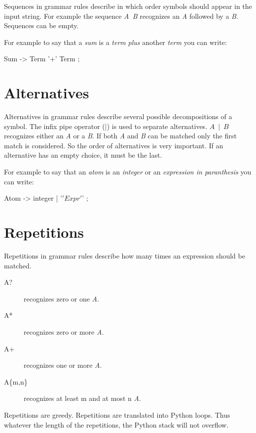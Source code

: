 Sequences in grammar rules describe in which order symbols should appear in the input string.
For example the sequence \emph{A~B} recognizes an \emph{A} followed by a \emph{B}.
Sequences can be empty.

For example to say that a \emph{sum} is a \emph{term} \emph{plus} another \emph{term} you can write:
\begin{verbatimtab}[4]
	Sum -> Term '+' Term ;
\end{verbatimtab}

\section{Alternatives}											\label{parser:alternatives}

Alternatives in grammar rules describe several possible decompositions of a symbol.
The infix pipe operator (\emph{$\mid$}) is used to separate alternatives.
\emph{$A~\mid~B$} recognizes either an \emph{A} or a \emph{B}.
If both \emph{A} and \emph{B} can be matched only the first match is considered.
So the order of alternatives is very important.
If an alternative has an empty choice, it must be the last.

For example to say that an \emph{atom} is an \emph{integer} or an \emph{expression in paranthesis}
you can write:
\begin{verbatimtab}[4]
	Atom -> integer | '\(' Expr '\)' ;
\end{verbatimtab}

\section{Repetitions}											\label{parser:repetitions}

Repetitions in grammar rules describe how many times an expression should be matched.

\begin{description}
	\item [A?] recognizes zero or one \emph{A}.
	\item [A*] recognizes zero or more \emph{A}.
	\item [A+] recognizes one or more \emph{A}.
	\item [A\{m,n\}] recognizes at least m and at most n \emph{A}.
\end{description}

Repetitions are greedy.
Repetitions are translated into Python loops.
Thus whatever the length of the repetitions, the Python stack will not overflow. 

